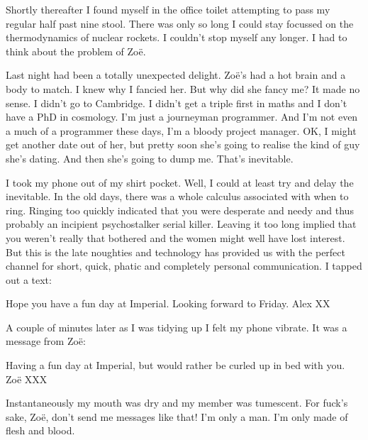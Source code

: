 Shortly thereafter I found myself in the office toilet attempting to
pass my regular half past nine stool. There was only so long I could
stay focussed on the thermodynamics of nuclear rockets. I couldn't
stop myself any longer. I had to think about the problem of Zoë.

Last night had been a totally unexpected delight. Zoë's had a
hot brain and a body to match. I knew why I fancied her. But why did
she fancy me? It made no sense. I didn't go to Cambridge. I didn't
get a triple first in maths and I don't have a PhD in cosmology. I'm
just a journeyman programmer. And I'm not even a much of a
programmer these days, I'm a bloody project manager. OK, I might get
another date out of her, but pretty soon she's going to realise the
kind of guy she's dating. And then she's going to dump me. That's
inevitable.

I took my phone out of my shirt pocket. Well, I could at least try
and delay the inevitable. In the old days, there was a whole
calculus associated with when to ring. Ringing too quickly indicated
that you were desperate and needy and thus probably an incipient
psychostalker serial killer. Leaving it too long implied that you
weren't really that bothered and the women might well have lost
interest. But this is the late noughties and technology has provided
us with the perfect channel for short, quick, phatic and completely
personal communication. I tapped out a text:

\startmessage
Hope you have a fun day at Imperial. Looking forward to
Friday. Alex XX
\stopmessage

A couple of minutes later as I was tidying up I felt my phone
vibrate. It was a message from Zoë:

\startmessage 
Having a fun day at Imperial, but would rather be curled
up in bed with you. Zoë XXX
\stopmessage

Instantaneously my mouth was dry and my member was tumescent. For
fuck's sake, Zoë, don't send me messages like that! I'm only a
man. I'm only made of flesh and blood.

